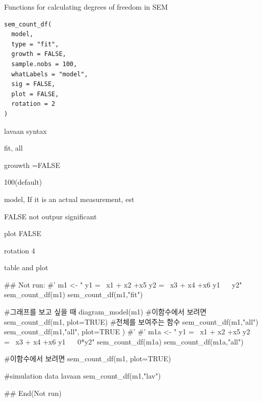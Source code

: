 \documentclass[a4paper]{book}
\begin{document}
%
\begin{Description}
Functions for calculating degrees of freedom in SEM
\end{Description}
%
\begin{Usage}
\begin{verbatim}
sem_count_df(
  model,
  type = "fit",
  growth = FALSE,
  sample.nobs = 100,
  whatLabels = "model",
  sig = FALSE,
  plot = FALSE,
  rotation = 2
)
\end{verbatim}
\end{Usage}
%
\begin{Arguments}
\begin{ldescription}
\item[\code{model}] lavaan syntax

\item[\code{type}] fit, all

\item[\code{growth}] grouwth =FALSE

\item[\code{sample.nobs}] 100(default)

\item[\code{whatLabels}] model, If it is an actual measurement, est

\item[\code{sig}] FALSE not outpur significant

\item[\code{plot}] plot FALSE

\item[\code{rotation}] rotation 4
\end{ldescription}
\end{Arguments}
%
\begin{Value}
table and plot
\end{Value}
%
\begin{Examples}
\begin{ExampleCode}

\#\# Not run: 
#'
m1 <- "
y1 =~ x1 + x2 +x5
y2 =~ x3 + x4 +x6
y1 ~~ y2"
sem_count_df(m1)
sem_count_df(m1,"fit")

#그래프를 보고 싶을 때
diagram_model(m1)
#이함수에서 보려면
sem_count_df(m1, plot=TRUE)
#전체를 보여주는 함수
sem_count_df(m1,"all")
sem_count_df(m1,"all", plot=TRUE )
#'
#'
m1a <- "
y1 =~ x1 + x2 +x5
y2 =~ x3 + x4 +x6
y1 ~~ 0*y2"
sem_count_df(m1a)
sem_count_df(m1a,"all")

#이함수에서 보려면
sem_count_df(m1, plot=TRUE)

#simulation data lavaan
sem_count_df(m1,"lav")


## End(Not run)
\end{ExampleCode}
\end{Examples}
\end{document}
